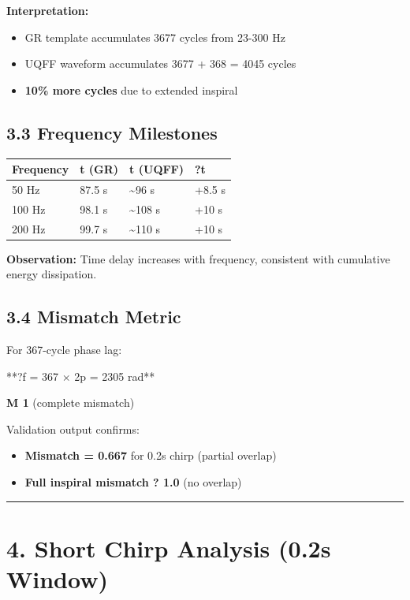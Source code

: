 \documentclass[11pt]{article}
\begin{document}
\textbf{Interpretation:}

\begin{itemize}
  \item GR template accumulates 3677 cycles from 23-300 Hz
  \item UQFF waveform accumulates 3677 + 368 = 4045 cycles
  \item \textbf{10\% more cycles} due to extended inspiral
\end{itemize}

\subsection*{3.3 Frequency Milestones}

\begin{center}
\begin{longtable}{llll}
\toprule
Frequency & t (GR) & t (UQFF) & ?t \tabularnewline
\midrule
\endhead
50 Hz & 87.5 s & \textasciitilde{}96 s & +8.5 s \tabularnewline
100 Hz & 98.1 s & \textasciitilde{}108 s & +10 s \tabularnewline
200 Hz & 99.7 s & \textasciitilde{}110 s & +10 s \tabularnewline
\bottomrule
\end{longtable}
\end{center}

\textbf{Observation:} Time delay increases with frequency, consistent with cumulative energy dissipation.

\subsection*{3.4 Mismatch Metric}

For 367-cycle phase lag:

**?f = 367 $\times$ 2p = 2305 rad**

\textbf{M  1} (complete mismatch)

Validation output confirms:

\begin{itemize}
  \item \textbf{Mismatch = 0.667} for 0.2s chirp (partial overlap)
  \item \textbf{Full inspiral mismatch ? 1.0} (no overlap)
\end{itemize}

\noindent\rule{\textwidth}{0.4pt}

\section*{4. Short Chirp Analysis (0.2s Window)}
\end{document}
